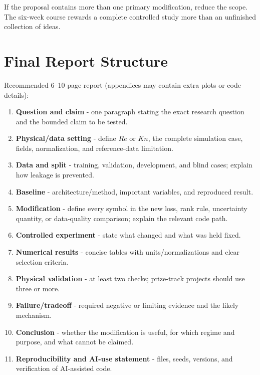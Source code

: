 \documentclass[11pt]{article}
\begin{document}
\begin{warningbox}
If the proposal contains more than one primary modification, reduce the scope. The six-week course rewards a complete controlled study more than an unfinished collection of ideas.
\end{warningbox}

\section{Final Report Structure}
Recommended 6--10 page report (appendices may contain extra plots or code details):
\begin{enumerate}
\item \textbf{Question and claim} - one paragraph stating the exact research question and the bounded claim to be tested.
\item \textbf{Physical/data setting} - define $Re$ or $Kn$, the complete simulation case, fields, normalization, and reference-data limitation.
\item \textbf{Data and split} - training, validation, development, and blind cases; explain how leakage is prevented.
\item \textbf{Baseline} - architecture/method, important variables, and reproduced result.
\item \textbf{Modification} - define every symbol in the new loss, rank rule, uncertainty quantity, or data-quality comparison; explain the relevant code path.
\item \textbf{Controlled experiment} - state what changed and what was held fixed.
\item \textbf{Numerical results} - concise tables with units/normalizations and clear selection criteria.
\item \textbf{Physical validation} - at least two checks; prize-track projects should use three or more.
\item \textbf{Failure/tradeoff} - required negative or limiting evidence and the likely mechanism.
\item \textbf{Conclusion} - whether the modification is useful, for which regime and purpose, and what cannot be claimed.
\item \textbf{Reproducibility and AI-use statement} - files, seeds, versions, and verification of AI-assisted code.
\end{enumerate}
\end{document}
